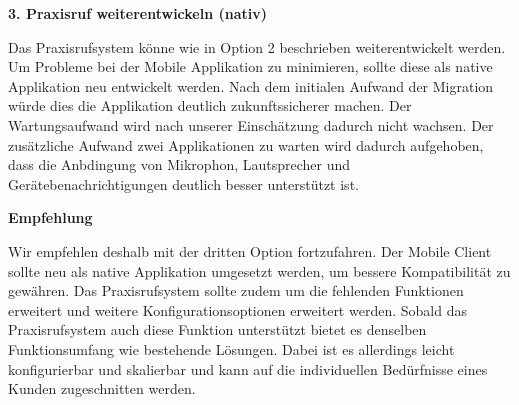 \textbf{3. Praxisruf weiterentwickeln (nativ) }

Das Praxisrufsystem könne wie in Option 2 beschrieben weiterentwickelt werden.
Um Probleme bei der Mobile Applikation zu minimieren, sollte diese als native Applikation neu entwickelt werden.
Nach dem initialen Aufwand der Migration würde dies die Applikation deutlich zukunftssicherer machen.
Der Wartungsaufwand wird nach unserer Einschätzung dadurch nicht wachsen.
Der zusätzliche Aufwand zwei Applikationen zu warten wird dadurch aufgehoben, dass die Anbdingung von Mikrophon, Lautsprecher
und Gerätebenachrichtigungen deutlich besser unterstützt ist.

\textbf{Empfehlung}

Wir empfehlen deshalb mit der dritten Option fortzufahren.
Der Mobile Client sollte neu als native Applikation umgesetzt werden, um bessere Kompatibilität zu gewähren.
Das Praxisrufsystem sollte zudem um die fehlenden Funktionen erweitert und weitere Konfigurationsoptionen erweitert werden.
Sobald das Praxisrufsystem auch diese Funktion unterstützt bietet es denselben Funktionsumfang wie bestehende Lösungen.
Dabei ist es allerdings leicht konfigurierbar und skalierbar und kann auf die individuellen Bedürfnisse eines Kunden zugeschnitten werden.

\clearpage
